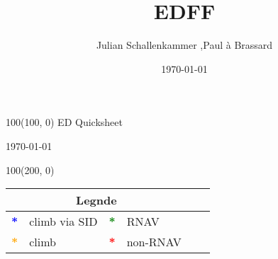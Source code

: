 \documentclass[10pt,landscape,a4paper]{article}
\title{EDFF}
\author{Julian Schallenkammer ,Paul à Brassard}
\date{\today}
\begin{document}
\setlength\extrarowheight{1pt}

\setlength{\TPHorizModule}{1mm}
\setlength{\TPVertModule}{\TPHorizModule}
\textblockorigin{7mm}{12mm}


\begin{textblock}{100}(100, 0)
  \large
  \centering
  ED Quicksheet

  \today
\end{textblock}

\begin{textblock}{100}(200, 0)
\begin{table}[]
\begin{tabular}{|llllll}
\multicolumn{4}{c}{\textbf{Legnde}} \\ \hline
\multicolumn{1}{|l|}{\textbf{\textcolor{blue}{*}}} 				& \multicolumn{1}{c|}{climb via SID} 	& \multicolumn{1}{|l|}{\textbf{\textcolor{green}{*}}}				& \multicolumn{1}{l|}{RNAV }			\\ \hline
\multicolumn{1}{|l|}{\textbf{\textcolor{orange}{*}}}			& \multicolumn{1}{l|}{climb }		& \multicolumn{1}{|l|}{\textbf{\textcolor{red}{*}}}						& \multicolumn{1}{l|}{non-RNAV }	\\ \hline
		

\end{tabular}
\end{table}
\end{textblock}
\end{document}
